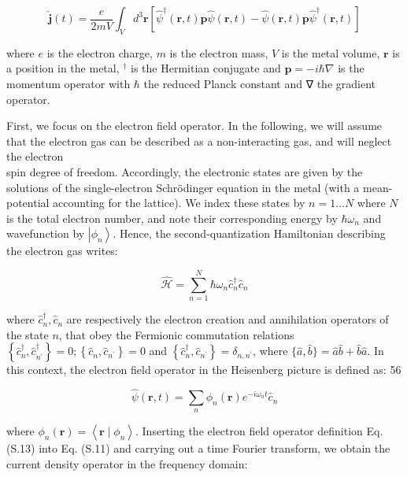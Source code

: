 \documentclass[10pt]{article}
\begin{document}
\begin{equation*}
\hat{\boldsymbol{j}}(t)=\frac{e}{2 m V} \int_{V} d^{3} \boldsymbol{r}\left[\hat{\psi}^{\dagger}(\boldsymbol{r}, t) \mathbf{p} \hat{\psi}(\boldsymbol{r}, t)-\hat{\psi}(\boldsymbol{r}, t) \mathbf{p} \hat{\psi}^{\dagger}(\boldsymbol{r}, t)\right] \tag{S.11}
\end{equation*}


where $e$ is the electron charge, $m$ is the electron mass, $V$ is the metal volume, $\boldsymbol{r}$ is a position in the metal, ${ }^{\dagger}$ is the Hermitian conjugate and $\mathbf{p}=-i \hbar \nabla$ is the momentum operator with $\hbar$ the reduced Planck constant and ∇ the gradient operator.

First, we focus on the electron field operator. In the following, we will assume that the electron gas can be described as a non-interacting gas, and will neglect the electron\\
spin degree of freedom. Accordingly, the electronic states are given by the solutions of the single-electron Schrödinger equation in the metal (with a mean-potential accounting for the lattice). We index these states by $n=1 \ldots N$ where $N$ is the total electron number, and note their corresponding energy by $\hbar \omega_{n}$ and wavefunction by $\left|\phi_{n}\right\rangle$. Hence, the second-quantization Hamiltonian describing the electron gas writes:


\begin{equation*}
\hat{\mathcal{H}}=\sum_{n=1}^{N} \hbar \omega_{n} \hat{c}_{n}^{\dagger} \hat{c}_{n} \tag{S.12}
\end{equation*}


where $\hat{c}_{n}^{\dagger}, \hat{c}_{n}$ are respectively the electron creation and annihilation operators of the state $n$, that obey the Fermionic commutation relations $\left\{\hat{c}_{n}^{\dagger}, \hat{c}_{n^{\prime}}^{\dagger}\right\}=0 ;\left\{\hat{c}_{n}, \hat{c}_{n^{\prime}}\right\}=0$ and $\left\{\hat{c}_{n}^{\dagger}, \hat{c}_{n^{\prime}}\right\}=\delta_{n, n^{\prime}}$, where $\{\hat{a}, \hat{b}\}=\hat{a} \hat{b}+\hat{b} \hat{a}$. In this context, the electron field operator in the Heisenberg picture is defined as: 56


\begin{equation*}
\hat{\psi}(\boldsymbol{r}, t)=\sum_{n} \phi_{n}(\boldsymbol{r}) e^{-i \omega_{n} t} \hat{c}_{n} \tag{S.13}
\end{equation*}


where $\phi_{n}(\boldsymbol{r})=\left\langle\boldsymbol{r} \mid \phi_{n}\right\rangle$. Inserting the electron field operator definition Eq. (S.13) into Eq. (S.11) and carrying out a time Fourier transform, we obtain the current density operator in the frequency domain:
\end{document}
